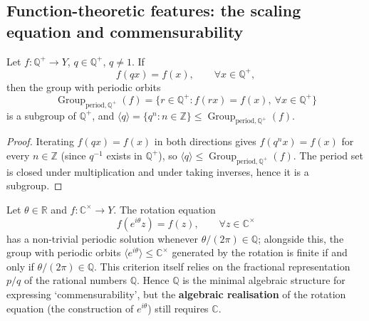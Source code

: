 \subsection{\texorpdfstring{Function-theoretic features: the scaling equation and commensurability}{Function-theoretic features: the scaling equation and commensurability}}

\begin{theorem}\label{thm:scaling_equation_Q}
Let $f:\mathbb{Q}^+\to Y$, $q\in\mathbb{Q}^+$, $q\ne1$. If
\[
f(qx)=f(x),\qquad \forall x\in\mathbb{Q}^+,
\]
then the group with periodic orbits
\[
\operatorname{Group}_{\mathrm{period},\mathbb{Q}^+}(f)=\{r\in\mathbb{Q}^+: f(rx)=f(x),\ \forall x\in\mathbb{Q}^+\}
\]
is a subgroup of $\mathbb{Q}^+$, and $\langle q\rangle=\{q^n:n\in\mathbb{Z}\}\le\operatorname{Group}_{\mathrm{period},\mathbb{Q}^+}(f)$.
\end{theorem}

\begin{proof}
Iterating $f(qx)=f(x)$ in both directions gives $f(q^n x)=f(x)$ for every $n\in\mathbb{Z}$ (since $q^{-1}$ exists in $\mathbb{Q}^+$), so $\langle q\rangle\le\operatorname{Group}_{\mathrm{period},\mathbb{Q}^+}(f)$. The period set is closed under multiplication and under taking inverses, hence it is a subgroup.
\end{proof}

\begin{theorem}\label{thm:rotation_equation_Q}
Let $\theta\in\mathbb{R}$ and $f:\mathbb{C}^\times\to Y$. The rotation equation
\[
f(e^{i\theta}z)=f(z),\qquad \forall z\in\mathbb{C}^\times
\]
has a non-trivial periodic solution whenever $\theta/(2\pi)\in\mathbb{Q}$; alongside this, the group with periodic orbits $\langle e^{i\theta}\rangle\le\mathbb{C}^\times$ generated by the rotation is finite if and only if $\theta/(2\pi)\in\mathbb{Q}$. This criterion itself relies on the fractional representation $p/q$ of the rational numbers $\mathbb{Q}$. Hence $\mathbb{Q}$ is the minimal algebraic structure for expressing `commensurability', but the \textbf{algebraic realisation} of the rotation equation (the construction of $e^{i\theta}$) still requires $\mathbb{C}$.
\end{theorem}

